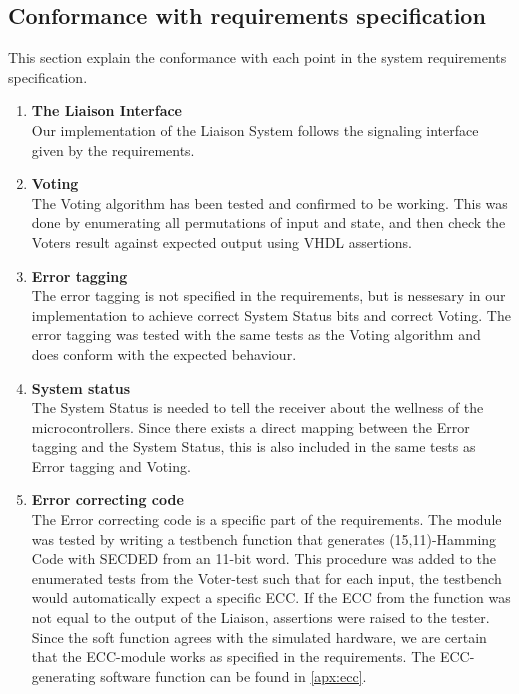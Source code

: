 \subsection{Conformance with requirements specification}
This section explain the conformance with each point in the system requirements specification.
\begin{enumerate}
\item{\textbf{The Liaison Interface}} \hfill\\
    Our implementation of the Liaison System follows the signaling interface given by the requirements.

\item{\textbf{Voting}} \hfill\\
    The Voting algorithm has been tested and confirmed to be working. This was done by enumerating all
    permutations of input and state, and then check the Voters result against expected output using
    VHDL assertions.

\item{\textbf{Error tagging}} \hfill\\
    The error tagging is not specified in the requirements, but is nessesary in our implementation to
    achieve correct System Status bits and correct Voting. The error tagging was tested with the same
    tests as the Voting algorithm and does conform with the expected behaviour.

\item{\textbf{System status}} \hfill\\
    The System Status is needed to tell the receiver about the wellness of the microcontrollers. Since
    there exists a direct mapping between the Error tagging and the System Status, this is also
    included in the same tests as Error tagging and Voting.

\item{\textbf{Error correcting code}} \hfill\\
    The Error correcting code is a specific part of the requirements. The module was tested by writing
    a testbench function that generates (15,11)-Hamming Code with SECDED from an 11-bit word. This
    procedure was added to the enumerated tests from the Voter-test such that for each input, the testbench
    would automatically expect a specific ECC. If the ECC from the function was not equal to the output
    of the Liaison, assertions were raised to the tester. Since the soft function agrees with the simulated
    hardware, we are certain that the ECC-module works as specified in the requirements. The ECC-generating
    software function can be found in \autoref{apx:ecc}.


\end{enumerate}

